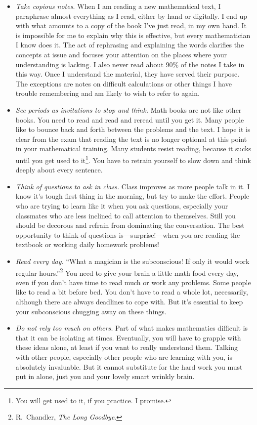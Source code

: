 \documentclass[twocolumn,12pt]{article}
\begin{document}
\begin{itemize}
    \item \emph{Take copious notes.} When I am reading a new mathematical text, I paraphrase almost everything as I read, either by hand or digitally. I end up with what amounts to a copy of the book I've just read, in my own hand. It is impossible for me to explain why this is effective, but every mathematician I know does it. The act of rephrasing and explaining the words clarifies the concepts at issue and focuses your attention on the places where your understanding is lacking. I also never read about 90\% of the notes I take in this way. Once I understand the material, they have served their purpose. The exceptions are notes on difficult calculations or other things I have trouble remembering and am likely to wish to refer to again.
    \item \emph{See periods as invitations to stop and think.} Math books are not like other books. You need to read and read and reread until you get it. Many people like to bounce back and forth between the problems and the text. I hope it is clear from the exam that reading the text is no longer optional at this point in your mathematical training. Many students resist reading, because it sucks until you get used to it\footnote{You will get used to it, if you practice. I promise.}. You have to retrain yourself to slow down and think deeply about every sentence.
    \item \emph{Think of questions to ask in class.} Class improves as more people talk in it. I know it's tough first thing in the morning, but try to make the effort. People who are trying to learn like it when you ask questions, especially your classmates who are less inclined to call attention to themselves. Still you should be decorous and refrain from dominating the conversation. The best opportunity to think of questions is---surprise!---when you are reading the textbook or working daily homework problems!
    \item \emph{Read every day.} ``What a magician is the subconscious! If only it would work regular hours.''\footnote{R.\ Chandler, \emph{The Long Goodbye}.} You need to give your brain a little math food every day, even if you don't have time to read much or work any problems. Some people like to read a bit before bed. You don't have to read a whole lot, necessarily, although there are always deadlines to cope with. But it's essential to keep your subconscious chugging away on these things.
    \item \emph{Do not rely too much on others.} Part of what makes mathematics difficult is that it can be isolating at times. Eventually, you will have to grapple with these ideas alone, at least if you want to really understand them. Talking with other people, especially other people who are learning with you, is absolutely invaluable. But it cannot substitute for the hard work you must put in alone, just you and your lovely smart wrinkly brain.

\end{itemize}
\end{document}
